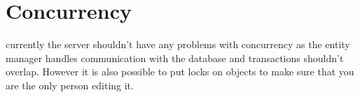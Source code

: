 \documentclass[a4paper,12pt]{scrartcl}
\begin{document}
	\section{Concurrency}
	{
		currently the server shouldn't have any problems with concurrency as the entity manager handles communication with the database and transactions shouldn't overlap. However it is also possible to put locks on objects to make sure that you are the only person editing it. 
	}
	
	\newpage
	
	\printbibliography[heading=bibintoc,title=References]
\end{document}
